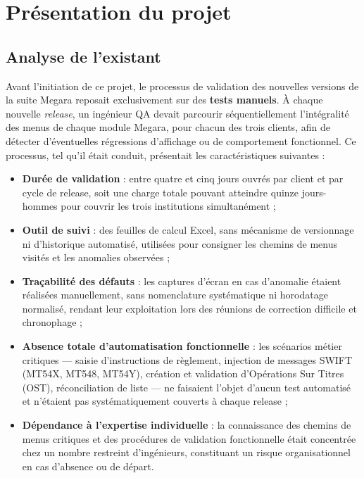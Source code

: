 \documentclass[12pt, a4paper]{report}
\begin{document}
\section{Présentation du projet}

\subsection{Analyse de l'existant}

Avant l'initiation de ce projet, le processus de validation des nouvelles versions de la suite Megara reposait exclusivement sur des \textbf{tests manuels}. À chaque nouvelle \textit{release}, un ingénieur QA devait parcourir séquentiellement l'intégralité des menus de chaque module Megara, pour chacun des trois clients, afin de détecter d'éventuelles régressions d'affichage ou de comportement fonctionnel. Ce processus, tel qu'il était conduit, présentait les caractéristiques suivantes :

\begin{itemize}
  \item \textbf{Durée de validation} : entre quatre et cinq jours ouvrés par client et par cycle de release, soit une charge totale pouvant atteindre quinze jours-hommes pour couvrir les trois institutions simultanément ;
  \item \textbf{Outil de suivi} : des feuilles de calcul Excel, sans mécanisme de versionnage ni d'historique automatisé, utilisées pour consigner les chemins de menus visités et les anomalies observées ;
  \item \textbf{Traçabilité des défauts} : les captures d'écran en cas d'anomalie étaient réalisées manuellement, sans nomenclature systématique ni horodatage normalisé, rendant leur exploitation lors des réunions de correction difficile et chronophage ;
  \item \textbf{Absence totale d'automatisation fonctionnelle} : les scénarios métier critiques — saisie d'instructions de règlement, injection de messages SWIFT (MT54X, MT548, MT54Y), création et validation d'Opérations Sur Titres (OST), réconciliation de liste — ne faisaient l'objet d'aucun test automatisé et n'étaient pas systématiquement couverts à chaque release ;
  \item \textbf{Dépendance à l'expertise individuelle} : la connaissance des chemins de menus critiques et des procédures de validation fonctionnelle était concentrée chez un nombre restreint d'ingénieurs, constituant un risque organisationnel en cas d'absence ou de départ.
\end{itemize}
\end{document}

